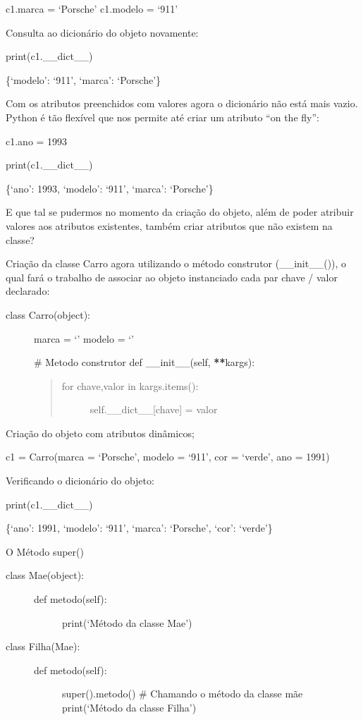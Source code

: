 \documentclass[letterpaper,10pt,brazil]{sphinxmanual}
\begin{document}
c1.marca = ‘Porsche’
c1.modelo = ‘911’

Consulta ao dicionário do objeto novamente:

print(c1.\_\_dict\_\_)

\{‘modelo’: ‘911’, ‘marca’: ‘Porsche’\}

Com os atributos preenchidos com valores agora o dicionário não está mais vazio.
Python é tão flexível que nos permite até criar um atributo “on the fly”:

c1.ano = 1993

print(c1.\_\_dict\_\_)

\{‘ano’: 1993, ‘modelo’: ‘911’, ‘marca’: ‘Porsche’\}

E que tal se pudermos no momento da criação do objeto, além de poder atribuir valores
aos atributos existentes, também criar atributos que não existem na classe?

Criação da classe Carro agora utilizando o método construtor (\_\_init\_\_()), o qual fará
o trabalho de associar ao objeto instanciado cada par chave / valor declarado:
\begin{description}
\item[{class Carro(object):}] \leavevmode
marca = ‘’
modelo = ‘’

\# Metodo construtor
def \_\_init\_\_(self, {\color{red}\bfseries{}**}kargs):
\begin{quote}
\begin{description}
\item[{for chave,valor in kargs.items():}] \leavevmode
self.\_\_dict\_\_{[}chave{]} = valor

\end{description}
\end{quote}

\end{description}

Criação do objeto com atributos dinâmicos;

c1 = Carro(marca = ‘Porsche’, modelo = ‘911’, cor = ‘verde’, ano = 1991)

Verificando o dicionário do objeto:

print(c1.\_\_dict\_\_)

\{‘ano’: 1991, ‘modelo’: ‘911’, ‘marca’: ‘Porsche’, ‘cor’: ‘verde’\}

O Método super()
\begin{description}
\item[{class Mae(object):}] \leavevmode\begin{description}
\item[{def metodo(self):}] \leavevmode
print(‘Método da classe Mae’)

\end{description}

\item[{class Filha(Mae):}] \leavevmode\begin{description}
\item[{def metodo(self):}] \leavevmode
super().metodo() \# Chamando o método da classe mãe
print(‘Método da classe Filha’)

\end{description}

\end{description}
\end{document}

